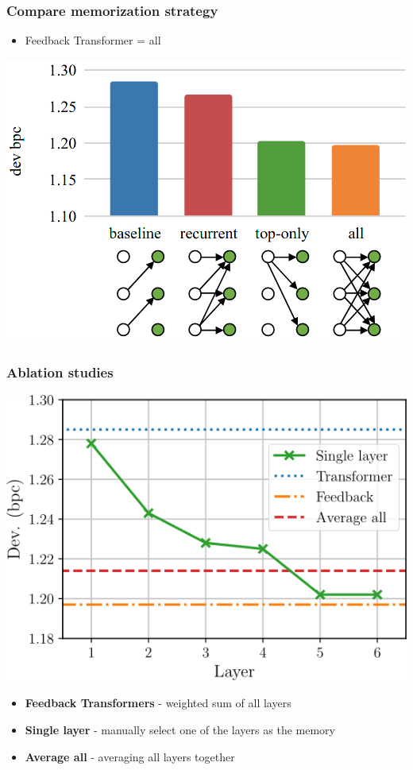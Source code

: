 \documentclass{beamer}
\begin{document}
\begin{frame}
    \frametitle{Compare memorization strategy}
    \begin{itemize}
        \item Feedback Transformer = all
    \end{itemize}
    \begin{center}
        \includegraphics[scale=0.42]{img/feedback_transformer_compare_memory.png}
    \end{center}
\end{frame}

\begin{frame}
    \frametitle{Ablation studies}
    \begin{center}
        \includegraphics[scale=0.35]{img/feedback_transformer_compare_ablation.png}
    \end{center}
    \begin{itemize}
        \item \footnotesize{\textbf{Feedback Transformers} - weighted sum of all layers}
        \item \textbf{Single layer} - manually select one of the layers as the memory
        \item \textbf{Average all} - averaging all layers together
    \end{itemize}
\end{frame}
\end{document}
